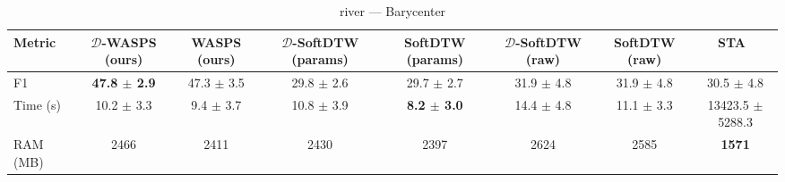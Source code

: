 \begin{table}[htbp]
\centering
\begin{NiceTabular}{lccccccc}
\toprule
Metric & $\mathcal{D}$-WASPS (ours) & WASPS (ours) & $\mathcal{D}$-SoftDTW (params) & SoftDTW (params) & $\mathcal{D}$-SoftDTW (raw) & SoftDTW (raw) & STA~\cite{janati2020spatio} \\
\midrule
F1 & \textbf{47.8 $\pm$ 2.9} & 47.3 $\pm$ 3.5 & 29.8 $\pm$ 2.6 & 29.7 $\pm$ 2.7 & 31.9 $\pm$ 4.8 & 31.9 $\pm$ 4.8 & 30.5 $\pm$ 4.8 \\
Time (s) & 10.2 $\pm$ 3.3 & 9.4 $\pm$ 3.7 & 10.8 $\pm$ 3.9 & \textbf{8.2 $\pm$ 3.0} & 14.4 $\pm$ 4.8 & 11.1 $\pm$ 3.3 & 13423.5 $\pm$ 5288.3 \\
RAM (MB) & 2466 & 2411 & 2430 & 2397 & 2624 & 2585 & \textbf{1571} \\
\bottomrule
\end{NiceTabular}
\caption{river --- Barycenter}
\label{tab:exp2_river_barycenter}
\end{table}
